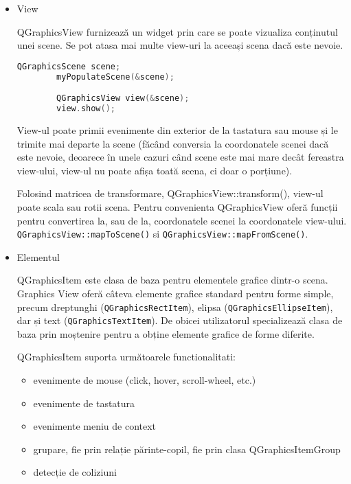 \begin{itemize}
    \item View
    
    QGraphicsView furnizează un widget prin care se poate vizualiza conținutul unei scene. Se pot atasa mai multe view-uri la 
    aceeași scena dacă este nevoie. 

    \begin{lstlisting}[language=C++]
        QGraphicsScene scene;
        myPopulateScene(&scene);

        QGraphicsView view(&scene);
        view.show();

    \end{lstlisting}

    View-ul poate primii evenimente din exterior de la tastatura sau mouse și le trimite mai departe la scene 
    (făcând conversia la coordonatele scenei dacă este nevoie, deoarece în unele cazuri când scene este mai mare 
    decât fereastra view-ului, view-ul nu poate afișa toată scena, ci doar o porțiune).\newline
    
    Folosind matricea de transformare, QGraphicsView::transform(), view-ul poate scala sau rotii scena. 
    Pentru convenienta QGraphicsView oferă funcții pentru convertirea la, sau de la, coordonatele scenei la 
    coordonatele view-ului. \verb|QGraphicsView::mapToScene()| si \verb|QGraphicsView::mapFromScene()|.\newline

    \item Elementul
    
    QGraphicsItem este clasa de baza pentru elementele grafice dintr-o scena. Graphics View oferă câteva elemente grafice 
    standard pentru forme simple, precum dreptunghi  (\verb|QGraphicsRectItem|), elipsa (\verb|QGraphicsEllipseItem|), dar și text 
    (\verb|QGraphicsTextItem|). De obicei utilizatorul specializează clasa de baza prin moștenire pentru a obține elemente 
    grafice de forme diferite.\newline

    QGraphicsItem suporta următoarele functionalitati:
    \begin{itemize}
        \item evenimente de mouse (click, hover, scroll-wheel, etc.)
        \item evenimente de tastatura
        \item evenimente meniu de context
        \item grupare, fie prin relație părinte-copil, fie prin clasa QGraphicsItemGroup
        \item detecție de coliziuni
    \end{itemize}


\end{itemize}
